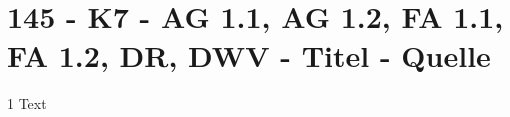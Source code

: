 \section{145 - K7 - AG 1.1, AG 1.2, FA 1.1, FA 1.2, DR, DWV - Titel - Quelle}

\begin{langesbeispiel}\item[1] %
Text

\end{langesbeispiel}